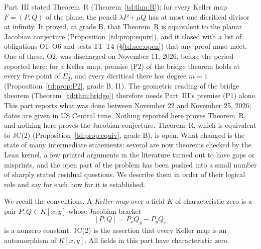 \documentclass[a4paper,11pt]{article}
\theoremstyle{jsplain}
\theoremstyle{jsdef}
\theoremstyle{jsrem}
\begin{document}
Part~III stated Theorem~R (Theorem~\ref{td:thm:R}): for every Keller map $F=(P,Q)$ of the plane, the pencil $\lambda P+\mu Q$ has at most one dicritical divisor at infinity. It proved, at grade B, that Theorem~R is equivalent to the planar Jacobian conjecture (Proposition~\ref{td:prop:equiv}), and it closed with a list of obligations O1--O6 and tests T1--T4 (\S\ref{td:sec:open}) that any proof must meet. One of these, O2, was discharged on November 11, 2026, before the period reported here: for a Keller map, premise (P2) of the bridge theorem holds at every free point of $E_2$, and every dicritical there has degree $m=1$ (Proposition~\ref{td:prop:P2}, grade B, I1). The geometric reading of the bridge theorem (Theorem~\ref{td:thm:bridge}) therefore needs Part~III's premise (P1) alone. This part reports what was done between November 22 and November 25, 2026; dates are given in US Central time. Nothing reported here proves Theorem~R, and nothing here proves the Jacobian conjecture. Theorem~R, which is equivalent to JC(2) (Proposition~\ref{td:prop:equiv}, grade B), is open. What changed is the state of many intermediate statements: several are now theorems checked by the Lean kernel, a few printed arguments in the literature turned out to have gaps or misprints, and the open part of the problem has been pushed into a small number of sharply stated residual questions. We describe them in order of their logical role and say for each how far it is established.

We recall the conventions. A \emph{Keller map} over a field $K$ of characteristic zero is a pair $P,Q\in K[x,y]$ whose Jacobian bracket
\[
[P,Q]=P_xQ_y-P_yQ_x
\]
is a nonzero constant. JC(2) is the assertion that every Keller map is an automorphism of $K[x,y]$. All fields in this part have characteristic zero.
\end{document}
